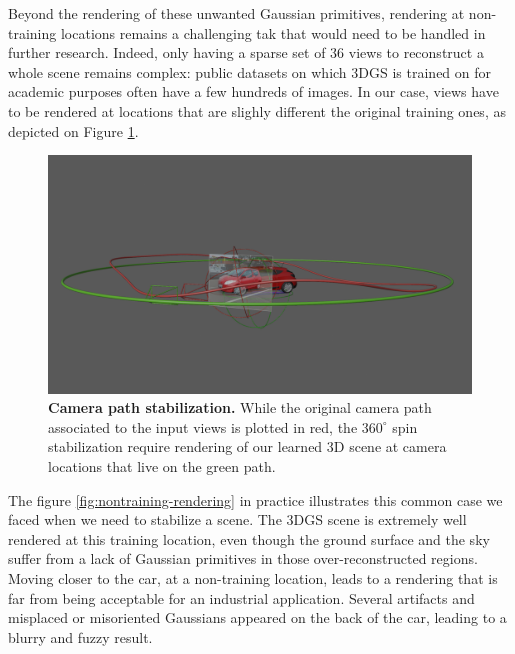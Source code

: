 Beyond the rendering of these unwanted Gaussian primitives, rendering at non-training locations remains a challenging tak that would need to be handled in further research. Indeed, only having a sparse set of 36 views to reconstruct a whole scene remains complex: public datasets on which 3D\ac{GS} is trained on for academic purposes often have a few hundreds of images. In our case, views have to be rendered at locations that are slighly different the original training ones, as depicted on Figure \ref{fig:theory-camera-path}. 

\begin{figure}[htb!]
  \center
\includegraphics[width=\linewidth]{images/gaussiansplatting/theory-camera-path.png}
\caption{\textbf{Camera path stabilization.} While the original camera path associated to the input views is plotted in red, the $360^{\circ}$ spin stabilization require rendering of our learned 3D scene at camera locations that live on the green path.}
\label{fig:theory-camera-path}
\end{figure}

The figure \ref{fig:nontraining-rendering} in practice illustrates this common case we faced when we need to stabilize a scene. The 3D\ac{GS} scene is extremely well rendered at this training location, even though the ground surface and the sky suffer from a lack of Gaussian primitives in those over-reconstructed regions. Moving closer to the car, at a non-training location, leads to a rendering that is far from being acceptable for an industrial application. Several artifacts and misplaced or misoriented Gaussians appeared on the back of the car, leading to a blurry and fuzzy result. 


